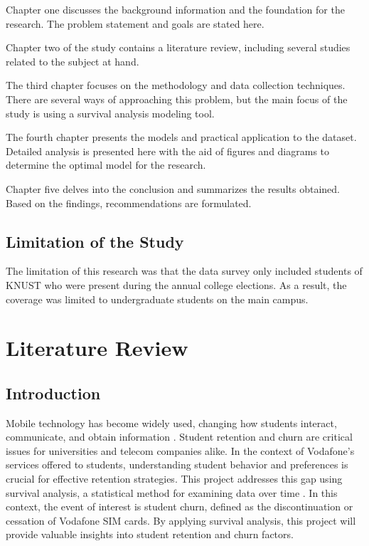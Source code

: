 \documentclass[12pt]{report} %
\begin{document}
Chapter one discusses the background information and the foundation for the research. The problem statement and goals are stated here.

Chapter two of the study contains a literature review, including several studies related to the subject at hand.

The third chapter focuses on the methodology and data collection techniques. There are several ways of approaching this problem, but the main focus of the study is using a survival analysis modeling tool.

The fourth chapter presents the models and practical application to the dataset. Detailed analysis is presented here with the aid of figures and diagrams to determine the optimal model for the research.

Chapter five delves into the conclusion and summarizes the results obtained. Based on the findings, recommendations are formulated.

\section{Limitation of the Study}

The limitation of this research was that the data survey only included students of KNUST who were present during the annual college elections. As a result, the coverage was limited to undergraduate students on the main campus.

\newpage
\chapter{Literature Review}


\section{Introduction}
Mobile technology has become widely used, changing how students interact, communicate, and obtain information \cite{Alqatani2020}. Student retention and churn are critical issues for universities and telecom companies alike. In the context of Vodafone's services offered to students, understanding student behavior and preferences is crucial for effective retention strategies. This project addresses this gap using survival analysis, a statistical method for examining data over time \cite{BoxSteffensmeier2020}. In this context, the event of interest is student churn, defined as the discontinuation or cessation of Vodafone SIM cards. By applying survival analysis, this project will provide valuable insights into student retention and churn factors.
\end{document}
